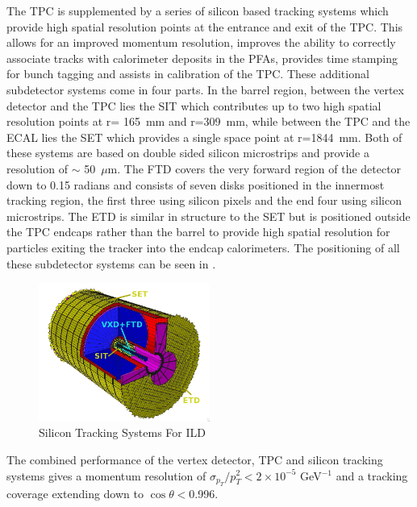 The \ac{TPC} is supplemented by a series of silicon based tracking systems which provide high spatial resolution points at the entrance and exit of the TPC. This allows for an improved momentum resolution, improves the ability to correctly associate tracks with calorimeter deposits in the \ac{PFA}s, provides time stamping for bunch tagging and assists in calibration of the \ac{TPC}. These additional subdetector systems come in four parts. In the barrel region, between the vertex detector and the \ac{TPC} lies the \ac{SIT} which contributes up to two high spatial resolution points at r= 165~mm and r=309~mm, while between the \ac{TPC} and the \ac{ECAL} lies the \ac{SET} which provides a single space point at r=1844~mm. Both of these systems are based on double sided silicon microstrips and provide a resolution of $\sim$ 50~$\mu$m. The \ac{FTD} covers the very forward region of the detector down to 0.15 radians and consists of seven disks positioned in the innermost tracking region, the first three using silicon pixels and the end four using silicon microstrips. The \ac{ETD} is similar in structure to the \ac{SET} but is positioned outside the \ac{TPC} endcaps rather than the barrel to provide high spatial resolution for particles exiting the tracker into the endcap calorimeters. The positioning of all these subdetector systems can be seen in .

\begin{figure}
  \centering
  \includegraphics[width=0.5\textwidth,keepaspectratio]{Experiments/fig/SiliconTrackers}
  \caption[Silicon Tracking Systems For ILD]{Silicon Tracking Systems For ILD \cite{ILD}}
  \label{fig:silicontracking}
\end{figure}

The combined performance of the vertex detector, \ac{TPC} and silicon tracking systems gives a momentum resolution of $\sigma_{p_T}/ p_{T}^2 < 2 \times 10^{-5}$ GeV$^{-1}$ and a tracking coverage extending down to $\cos\theta<$0.996.


